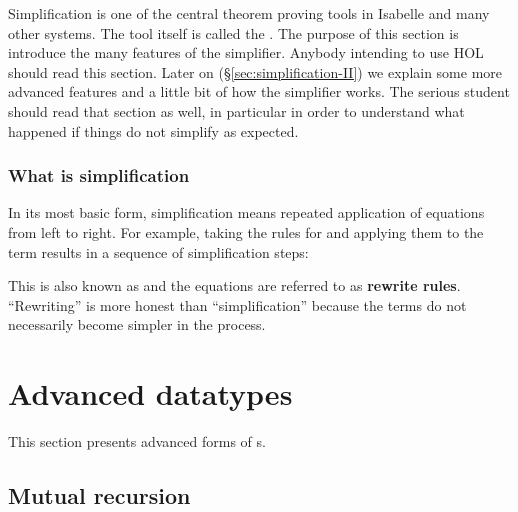 Simplification is one of the central theorem proving tools in Isabelle and
many other systems. The tool itself is called the . The
purpose of this section is introduce the many features of the simplifier.
Anybody intending to use HOL should read this section. Later on
({\S}\ref{sec:simplification-II}) we explain some more advanced features and a
little bit of how the simplifier works. The serious student should read that
section as well, in particular in order to understand what happened if things
do not simplify as expected.

\subsubsection{What is simplification}

In its most basic form, simplification means repeated application of
equations from left to right. For example, taking the rules for \isa{\at}
and applying them to the term \isa{[0,1] \at\ []} results in a sequence of
simplification steps:
This is also known as  and the
equations are referred to as \textbf{rewrite rules}.
``Rewriting'' is more honest than ``simplification'' because the terms do not
necessarily become simpler in the process.






\begin{exercise}
%
\end{exercise}




\section{Advanced datatypes}
\label{sec:advanced-datatypes}

This section presents advanced forms of s.

\subsection{Mutual recursion}
\label{sec:datatype-mut-rec}


